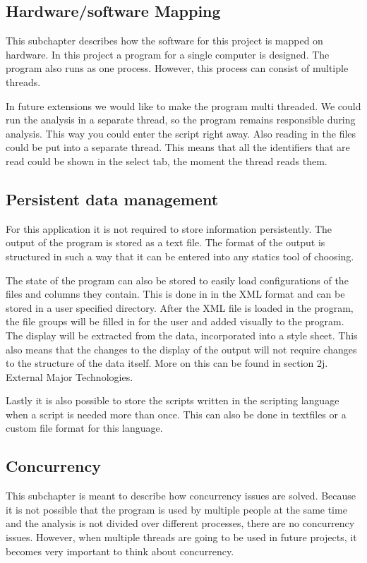 \documentclass[a4paper,english,fleqn]{exam}
\begin{document}
\subsection{Hardware/software Mapping}
This subchapter describes how the software for this project is mapped on hardware. In this project a program for a single computer is designed. The program also runs as one process. However, this process can consist of multiple threads.

In future extensions we would like to make the program multi threaded. We could run the analysis in a separate thread, so the program remains responsible during analysis. This way you could enter the script right away. Also reading in the files could be put into a separate thread. This means that all the identifiers that are read could be shown in the select tab, the moment the thread reads them.
 
\newpage

\subsection{Persistent data management}
For this application it is not required to store information persistently. The output of the program is stored as a text file. The format of the output is structured in such a way that it can be entered into any statics tool of choosing.

The state of the program can also be stored to easily load configurations of the files and columns they contain. This is done in in the XML format and can be stored in a user specified directory. After the XML file is loaded in the program, the file groups will be filled in for the user and added visually to the program. The display will be extracted from the data, incorporated into a style sheet. This also means that the changes to the display of the output will not require changes to the structure of the data itself. More on this can be found in section 2j. External Major Technologies.
 
Lastly it is also possible to store the scripts written in the scripting language when a script is needed more than once. This can also be done in textfiles or a custom file format for this language.


\subsection{Concurrency}
This subchapter is meant to describe how concurrency issues are solved. Because it is not possible that the program is used by multiple people at the same time and the analysis is not divided over different processes, there are no concurrency issues. However, when multiple threads are going to be used in future projects, it becomes very important to think about concurrency.
\end{document}
